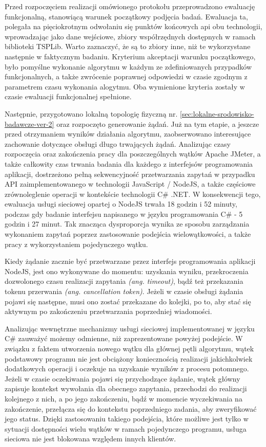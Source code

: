 Przed rozpoczęciem realizacji omówionego protokołu przeprowadzono ewaluację funkcjonalną, stanowiącą warunek początkowy podjęcia badań. Ewaluacja ta, polegała na pięciokrotnym odwołaniu się punktów końcowych api obu technologii, wprowadzając jako dane wejściowe, zbiory współrzędnych dostępnych w ramach biblioteki TSPLib. Warto zaznaczyć, że są to zbiory inne, niż te wykorzystane następnie w faktycznym badaniu. Kryterium akceptacji warunku początkowego, było pomyślne wykonanie algorytmu w każdym ze zdefiniowanych przypadków funkcjonalnych, a także zwrócenie poprawnej odpowiedzi w czasie zgodnym z parametrem czasu wykonania alogytmu. Oba wymienione kryteria zostały w czasie ewaluacji funkcjonalnej spełnione.

Następnie, przygotowano lokalną topologię fizyczną nr. \ref{sec:lokalne-srodowisko-badawcze-ver-2} oraz rozpoczęto generowanie żądań. Już na tym etapie, a jeszcze przed otrzymaniem wyników działania algorytmu, zaobserwowano interesujące zachowanie dotyczące obsługi długo trwających żądań. Analizując czasy rozpoczęcia oraz zakończenia pracy dla poszczególnych wątków Apache JMeter, a także całkowity czas trwania badania dla każdego z interfejsów programowania aplikacji, dostrzeżono pełną sekwencyjność przetwarzania zapytań w przypadku API zaimplementowanego w technologii JavaScript / NodeJS, a także częściowe zrównoleglenie operacji w kontekście technologii C\# .NET. W konsekwencji tego, ewaluacja usługi sieciowej opartej o NodeJS trwała 18 godzin i 52 minuty, podczas gdy badanie interfejsu napisanego w języku programowania C\# - 5 godzin i 27 minut. Tak znacząca dysproporcja wynika ze sposobu zarządzania wykonaniem zapytań poprzez zastosowanie podejścia wielowątkowości, a także pracy z wykorzystaniem pojedynczego wątku.

Kiedy żądanie zacznie być przetwarzane przez interfejs programowania aplikacji NodeJS, jest ono wykonywane do momentu: uzyskania wyniku, przekroczenia dozwolonego czasu realizacji zapytania \textit{(ang. timeout)}, bądź też przekazania tokenu przerwania \textit{(ang. cancellation token)}. Jeżeli w czasie obsługi żądania pojawi się następne, musi ono zostać przekazane do kolejki, po to, aby stać się aktywnym po zakończeniu przetwarzania poprzedniej wiadomości.

Analizując wewnętrzne mechanizmy usługi sieciowej implementowanej w języku C\# zauważyć możemy odmienne, niż zaprezentowane powyżej podejście. W związku z faktem utworzenia nowego wątku dla głównej pętli algorytmu, wątek podstawowy programu nie jest obciążony koniecznością realizacji jakichkolwiek dodatkowych operacji i oczekuje na uzyskanie wyników z procesu potomnego. Jeżeli w czasie oczekiwania pojawi się przychodzące żądanie, wątek główny zapisuje kontekst wywołania dla obecnego zapytania, przechodzi do realizacji kolejnego z nich, a po jego zakończeniu, bądź w momencie wyczekiwania na zakończenie, przełącza się do kontekstu poprzedniego zadania, aby zweryfikować jego status. Dzięki zastosowaniu takiego podejścia, które możliwe jest tylko w sytuacji dostępności wielu wątków w ramach pojedynczego programu, usługa sieciowa nie jest blokowana względem innych klientów.

